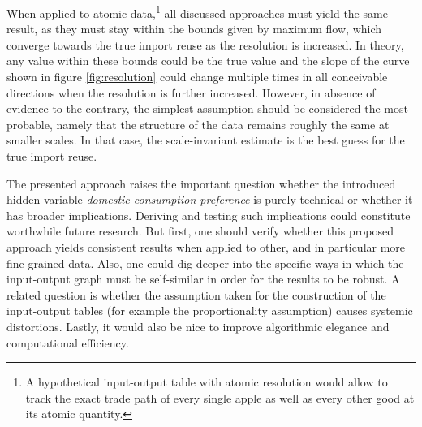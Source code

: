 \documentclass[english]{uzhpub}
\begin{document}
When applied to atomic data,\footnote{A hypothetical input-output table with atomic resolution would allow to track the exact trade path of every single apple as well as every other good at its atomic quantity.} all discussed approaches must yield the same result, as they must stay within the bounds given by maximum flow, which converge towards the true import reuse as the resolution is increased. In theory, any value within these bounds could be the true value and the slope of the curve shown in figure \ref{fig:resolution} could change multiple times in all conceivable directions when the resolution is further increased. However, in absence of evidence to the contrary, the simplest assumption should be considered the most probable, namely that the structure of the data remains roughly the same at smaller scales. In that case, the scale-invariant estimate is the best guess for the true import reuse.

The presented approach raises the important question whether the introduced hidden variable \emph{domestic consumption preference} is purely technical or whether it has broader implications. Deriving and testing such implications could constitute worthwhile future research. But first, one should verify whether this proposed approach yields consistent results when applied to other, and in particular more fine-grained data. Also, one could dig deeper into the specific ways in which the input-output graph must be self-similar in order for the results to be robust. A related question is whether the assumption taken for the construction of the input-output tables (for example the proportionality assumption) causes systemic distortions. Lastly, it would also be nice to improve algorithmic elegance and computational efficiency.


\end{document}
